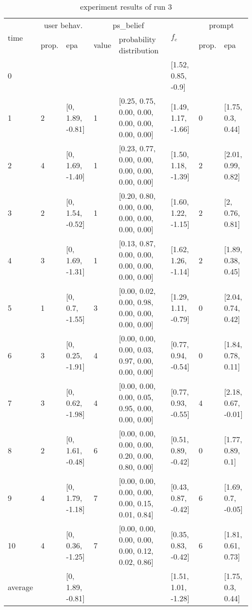 \begin{table}[htbp]\footnotesize
\caption{experiment results of run 3}
\begin{center}
\begin{tabular}{|p{0.4cm}|p{0.6cm}|l|p{0.6cm}|p{3.3cm}|l|p{0.6cm}|l|}
\hline

\multirow{2}{*}{time} & \multicolumn{2}{c|}{user behav.} & \multicolumn{2}{c|}{ps\_belief} &
\multirow{2}{*}{$f_c$} & \multicolumn{2}{c|}{prompt} \\ \cline{2-5}\cline{ 7- 8}
& prop. & epa & value & probability distribution &  & prop. & epa \\ \hline

0 & \multicolumn{1}{l|}{} &  & \multicolumn{1}{l|}{} &  & [1.52, 0.85, -0.9] & \multicolumn{1}{l|}{} &  \\ \hline
1 & 2 & [0, 1.89, -0.81] & 1 & [0.25, 0.75, 0.00, 0.00, 0.00, 0.00, 0.00, 0.00] & [1.49, 1.17, -1.66] & 0 & [1.75, 0.3, 0.44] \\ \hline
2 & 4 & [0, 1.69, -1.40] & 1 & [0.23, 0.77, 0.00, 0.00, 0.00, 0.00, 0.00, 0.00] & [1.50, 1.18, -1.39] & 2 & [2.01, 0.99, 0.82] \\ \hline
3 & 2 & [0, 1.54, -0.52] & 1 & [0.20, 0.80, 0.00, 0.00, 0.00, 0.00, 0.00, 0.00] & [1.60, 1.22, -1.15] & 2 & [2, 0.76, 0.81] \\ \hline
4 & 3 & [0, 1.69, -1.31] & 1 & [0.13, 0.87, 0.00, 0.00, 0.00, 0.00, 0.00, 0.00] & [1.62, 1.26, -1.14] & 2 & [1.89, 0.38, 0.45] \\ \hline
5 & 1 & [0, 0.7, -1.55] & 3 & [0.00, 0.02, 0.00, 0.98, 0.00, 0.00, 0.00, 0.00] & [1.29, 1.11, -0.79] & 0 & [2.04, 0.74, 0.42] \\ \hline
6 & 3 & [0, 0.25, -1.91] & 4 & [0.00, 0.00, 0.00, 0.03, 0.97, 0.00, 0.00, 0.00] & [0.77, 0.94, -0.54] & 0 & [1.84, 0.78, 0.11] \\ \hline
7 & 3 & [0, 0.62, -1.98] & 4 & [0.00, 0.00, 0.00, 0.05, 0.95, 0.00, 0.00, 0.00] & [0.77, 0.93, -0.55] & 4 & [2.18, 0.67, -0.01] \\ \hline
8 & 2 & [0, 1.61, -0.48] & 6 & [0.00, 0.00, 0.00, 0.00, 0.20, 0.00, 0.80, 0.00] & [0.51, 0.89, -0.42] & 0 & [1.77, 0.89, 0.1] \\ \hline
9 & 4 & [0, 1.79, -1.18] & 7 & [0.00, 0.00, 0.00, 0.00, 0.00, 0.15, 0.01, 0.84] & [0.43, 0.87, -0.42] & 6 & [1.69, 0.7, -0.05] \\ \hline
10 & 4 & [0, 0.36, -1.25] & 7 & [0.00, 0.00, 0.00, 0.00, 0.00, 0.12, 0.02, 0.86] & [0.35, 0.83, -0.42] & 6 & [1.81, 0.61, 0.73] \\ \hline
\multicolumn{1}{|l|}{average} & \multicolumn{1}{l|}{} & [0, 1.89, -0.81] & \multicolumn{1}{l|}{} &  & [1.51, 1.01, -1.28] & \multicolumn{1}{l|}{} & [1.75, 0.3, 0.44] \\ \hline
\end{tabular}
\end{center}
\label{}
\end{table}


